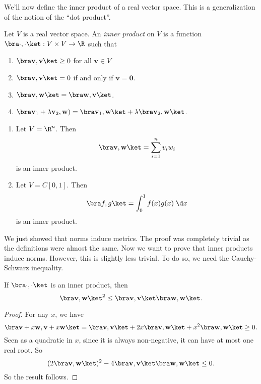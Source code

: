 \documentclass[a4paper]{article}
\begin{document}
We'll now define the inner product of a real vector space. This is a generalization of the notion of the ``dot product''.
\begin{defi}
  Let $V$ is a real vector space. An \emph{inner product} on $V$ is a function $\bra \cdot, \cdot\ket: V\times V \to \R$ such that
  \begin{enumerate}
    \item $\bra \mathbf{v}, \mathbf{v}\ket \geq 0$ for all $\mathbf{v}\in V$
    \item $\bra \mathbf{v}, \mathbf{v}\ket = 0$ if and only if $\mathbf{v} = \mathbf{0}$.
    \item $\bra \mathbf{v}, \mathbf{w}\ket = \bra \mathbf{w}, \mathbf{v}\ket$.
    \item $\bra \mathbf{v}_1 + \lambda \mathbf{v}_2, \mathbf{w}) = \bra \mathbf{v}_1, \mathbf{w}\ket + \lambda\bra \mathbf{v}_2 , \mathbf{w}\ket$.
  \end{enumerate}
\end{defi}

\begin{eg}\leavevmode
  \begin{enumerate}
    \item Let $V = \R^n$. Then
      \[
        \bra \mathbf{v}, \mathbf{w} \ket = \sum_{i = 1}^n v_i w_i
      \]
      is an inner product.
    \item Let $V = C[0, 1]$. Then
      \[
        \bra f, g\ket = \int_0^1 f(x) g(x) \;\d x
      \]
      is an inner product.
  \end{enumerate}
\end{eg}

We just showed that norms induce metrics. The proof was completely trivial as the definitions were almost the same. Now we want to prove that inner products induce norms. However, this is slightly less trivial. To do so, we need the Cauchy-Schwarz inequality.

\begin{thm}
  If $\bra\cdot,\cdot\ket$ is an inner product, then
  \[
    \bra \mathbf{v}, \mathbf{w}\ket^2 \leq \bra \mathbf{v}, \mathbf{v}\ket\bra\mathbf{w},\mathbf{w}\ket.
  \]
\end{thm}

\begin{proof}
  For any $x$, we have
  \[
    \bra \mathbf{v} + x\mathbf{w}, \mathbf{v} + x \mathbf{w}\ket = \bra \mathbf{v}, \mathbf{v}\ket + 2x\bra \mathbf{v}, \mathbf{w}\ket + x^2 \bra \mathbf{w}, \mathbf{w}\ket \geq 0.
  \]
  Seen as a quadratic in $x$, since it is always non-negative, it can have at most one real root. So
  \[
    (2 \bra \mathbf{v}, \mathbf{w}\ket)^2 - 4\bra \mathbf{v}, \mathbf{v}\ket \bra \mathbf{w}, \mathbf{w}\ket \leq 0.
  \]
  So the result follows.
\end{proof}
\end{document}
